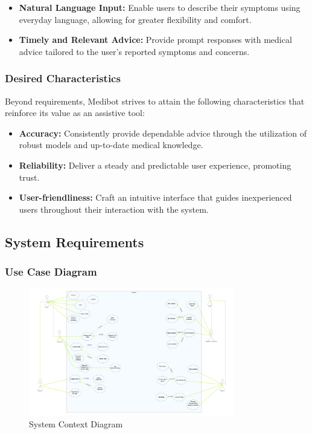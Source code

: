 \begin{itemize}
    \item \textbf{Natural Language Input:} Enable users to describe their symptoms using everyday language, allowing for greater flexibility and comfort.
    \item \textbf{Timely and Relevant Advice:} Provide prompt responses with medical advice tailored to the user's reported symptoms and concerns.
\end{itemize}

\subsubsection{Desired Characteristics}
Beyond  requirements,  Medibot  strives  to  attain the following characteristics that reinforce its  value as an assistive tool:

\begin{itemize}
    \item \textbf{Accuracy:}  Consistently provide dependable advice through the utilization of robust models and up-to-date medical knowledge.
    \item \textbf{Reliability:} Deliver a steady and predictable user experience, promoting trust.
    \item \textbf{User-friendliness:} Craft an intuitive interface that guides inexperienced users throughout their interaction with the system.
\end{itemize}


\subsection{System Requirements}

\subsubsection{Use Case Diagram}
\begin{figure}[H] 
    \centering
    \includegraphics[width=0.8\textwidth]{./Figures/use_case.jpg} 
    \caption{System Context Diagram} 
    \label{fig:mysvg} 
\end{figure}


